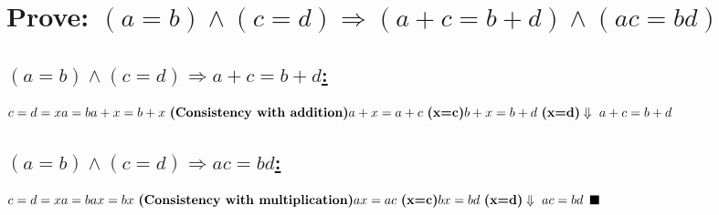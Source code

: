 \documentclass[a4paper, 12pt]{article}
\newcommand{\sub}[1]{\subsection{\underline{#1}}}
\newcommand{\?}{\stackrel{?}{=}}
\renewcommand{\qed}{\ensuremath{\blacksquare\pagebreak}}
\renewcommand{\b}[1]{\textbf{#1}}
\renewcommand{\because}[1]{~\b{(#1)}\\}
\renewcommand{\d}{\ensuremath{\Downarrow\\~}}
\begin{document}
\section{Prove: $ (a=b) \land (c=d) \Rightarrow (a+c=b+d) \land (ac=bd) $}

\sub{$ (a=b) \land (c=d) \Rightarrow a+c=b+d $:}
$
    c=d=x \\
    a=b \\
    a+x=b+x \because{Consistency with addition}
    a+x=a+c \because{x=c}
    b+x=b+d \because{x=d}
    \d
    a+c=b+d\\
$

\sub{$ (a=b) \land (c=d) \Rightarrow ac=bd $:}
$
    c=d=x \\
    a=b \\
    ax=bx \because{Consistency with multiplication}
    ax=ac \because{x=c}
    bx=bd \because{x=d}
    \d
    ac=bd\\
$
\qed

\end{document}
